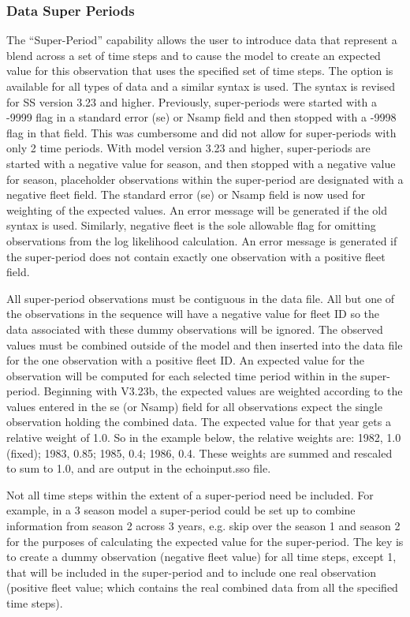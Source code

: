 \subsubsection{Data Super Periods}
The “Super-Period” capability allows the user to introduce data that represent a blend across a set of time steps and to cause the model to create an expected value for this observation that uses the specified set of time steps.  The option is available for all types of data and a similar syntax is used.  The syntax is revised for SS version 3.23 and higher.  Previously, super-periods were started with a -9999 flag in a standard error (se) or Nsamp field and then stopped with a -9998 flag in that field.  This was cumbersome and did not allow for super-periods with only 2 time periods.  With model version 3.23 and higher, super-periods are started with a negative value for season, and then stopped with a negative value for season, placeholder observations within the super-period are designated with a negative fleet field.  The standard error (se) or Nsamp field is now used for weighting of the expected values.  An error message will be generated if the old syntax is used.  Similarly, negative fleet is the sole allowable flag for omitting observations from the log likelihood calculation.   An error message is generated if the super-period does not contain exactly one observation with a positive fleet field.

All super-period observations must be contiguous in the data file.  All but one of the observations in the sequence will have a negative value for fleet ID so the data associated with these dummy observations will be ignored. The observed values must be combined outside of the model and then inserted into the data file for the one observation with a positive fleet ID.
An expected value for the observation will be computed for each selected time period within in the super-period.  Beginning with V3.23b, the expected values are weighted according to the values entered in the se (or Nsamp) field for all observations expect the single observation holding the combined data.  The expected value for that year gets a relative weight of 1.0.  So in the example below, the relative weights are:  1982, 1.0 (fixed); 1983, 0.85; 1985, 0.4; 1986, 0.4.  These weights are summed and rescaled to sum to 1.0, and are output in the echoinput.sso file.

Not all time steps within the extent of a super-period need be included.  For example, in a 3 season model a super-period could be set up to combine information from season 2 across 3 years, e.g. skip over the season 1 and season 2 for the purposes of calculating the expected value for the super-period.  The key is to create a dummy observation (negative fleet value) for all time steps, except 1, that will be included in the super-period and to include one real observation (positive fleet value; which contains the real combined data from all the specified time steps).

